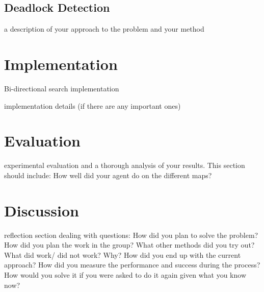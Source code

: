 \documentclass[a4paper,11pt]{article}
\begin{document}
\subsection{Deadlock Detection}
a description of your approach to the problem and your method
\section{Implementation}
\begin{algorithm}
\caption{Bi-directional search implementation}
\end{algorithm}

implementation details (if there are any important ones)
\section{Evaluation}
experimental evaluation and a thorough analysis of your results. This section should include:
How well did your agent do on the different maps?
\section{Discussion}
reflection section dealing with questions: How did you plan to solve the problem? How did you plan the work in the group? What other methods did you try out? What did work/ did not work? Why? How did you end up with the current approach? How did you measure the performance and success during the process? How would you solve it if you were asked to do it again given what you know now?

\printbibliography
\end{document}
